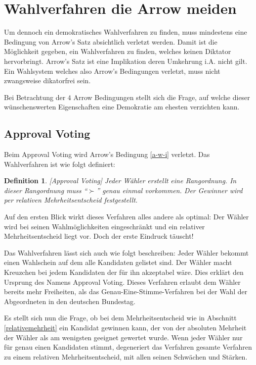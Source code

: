 \documentclass[BCOR5mm,DIV12,a4paper,10pt]{scrartcl}
\newtheorem{definition}[lemma]{Definition} %
\begin{document}
\section{Wahlverfahren die Arrow meiden}
Um dennoch ein demokratisches Wahlverfahren zu finden, muss mindestens eine Bedingung von Arrow's Satz absichtlich verletzt werden. Damit ist die Möglichkeit gegeben, ein Wahlverfahren zu finden, welches keinen Diktator hervorbringt.
Arrow's Satz ist eine Implikation deren Umkehrung i.A. nicht gilt. Ein Wahlsystem welches also Arrow's Bedingungen verletzt, muss nicht zwangsweise dikatorfrei sein.

Bei Betrachtung der $4$ Arrow Bedingungen stellt sich die Frage, auf welche dieser wünschenswerten Eigenschaften eine Demokratie am ehesten verzichten kann. 

\subsection{Approval Voting}
Beim Approval Voting wird Arrow's Bedingung \ref{a-w-i} verletzt. Das Wahlverfahren ist wie folgt definiert:
\begin{definition}\emph{[Approval Voting]}
Jeder Wähler erstellt eine Rangordnung. In dieser Rangordnung muss ``$\succ$'' genau einmal vorkommen. Der Gewinner wird per relativen Mehrheitsentscheid festgestellt.
\end{definition}

Auf den ersten Blick wirkt dieses Verfahren alles andere als optimal: Der Wähler wird bei seinen Wahlmöglichkeiten eingeschränkt und ein relativer Mehrheitsentscheid liegt vor. Doch der erste Eindruck täuscht!

Das Wahlverfahren lässt sich auch wie folgt beschreiben: Jeder Wähler bekommt einen Wahlschein auf dem alle Kandidaten gelistet sind. Der Wähler macht Kreuzchen bei jedem Kandidaten der für ihn akzeptabel wäre. Dies erklärt den Ursprung des Namens Approval Voting. Dieses Verfahren erlaubt dem Wähler bereits mehr Freiheiten, als das Genau-Eine-Stimme-Verfahren bei der Wahl der Abgeordneten in den deutschen Bundestag.

Es stellt sich nun die Frage, ob bei dem Mehrheitsentscheid wie in Abschnitt \ref{relativemehrheit} ein Kandidat gewinnen kann, der von der absoluten Mehrheit der Wähler als am wenigsten geeignet gewertet wurde. Wenn jeder Wähler nur für genau einen Kandidaten stimmt, degeneriert das Verfahren gesamte Verfahren zu einem relativen Mehrheitsentscheid, mit allen seinen Schwächen und Stärken.
\end{document}
